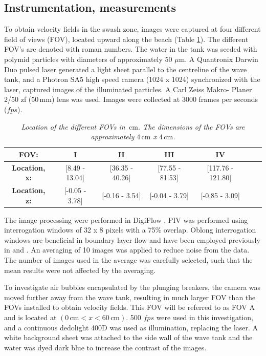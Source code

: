\documentclass[review, authoryear]{elsarticle}
\newcommand{\cm}{\,\mbox{cm}}
\newcommand{\mm}{\,\mbox{mm}}
\begin{document}
\subsection{Instrumentation, measurements}
\label{ins_measure}
To obtain velocity fields in the swash zone, images were captured at four different field of views (FOV), located upward along the beach (Table \ref{tab:loc}). The different FOV's are denoted with roman numbers. The water in the tank was seeded with polymid particles with diameters of approximately $50$ $\mu$m. A Quantronix Darwin Duo pulsed laser generated a light sheet parallel to the centreline of the wave tank, and a Photron SA5 high speed camera (1024 x 1024) synchronized with the laser, captured images of the illuminated particles. A Carl Zeiss Makro- Planer 2/50 zf ($50\mm$) lens was used. Images were collected at 3000 frames per seconds ($fps$).
 \begin{table}[]
 \centering
\caption{\textit{Location of the different FOVs  in $\cm$. The dimensions of the FOVs are approximately $4\cm$ x $4\cm$.}}
\begin{tabular}{|c|c|c|c|c|c|c|}
\hline
\textbf{FOV:}      & I                   & II                 & III     & IV \\ \hline
\textbf{Location, x:}& {[}8.49 - 13.04{]} & {[}36.35 - 40.26{]} & {[}77.55 - 81.53{]} & {[}117.76 - 121.80{]} 
 \\ \hline
\textbf{Location, z:}&  {[}-0.05 - 3.78{]} & {[}-0.16 - 3.54{]} & {[}-0.04 - 3.79{]} & {[}-0.85 - 3.09{]} 
\\ \hline
\end{tabular}
\label{tab:loc}
\end{table}
The image processing were performed in DigiFlow \citep{digiflow}. PIV was performed using interrogation windows of 32 x 8 pixels with a 75\% overlap. Oblong interrogation windows are beneficial in boundary layer flow and have been employed previously in \cite{liu2007boundary} and \cite{pedersen2013runup}. An averaging of 10 images was applied to reduce noise from the data. The number of images used in the average was carefully selected, such that the mean results were not affected by the averaging. 

To investigate air bubbles encapsulated by the plunging breakers, the camera was moved further away from the wave tank, resulting in much larger FOV than the FOVs installed to obtain velocity fields. This FOV will be referred to as FOV A and is located at $(0\cm< x <60\cm)$.  500 $fps$ were used in this investigation, and a continuous dedolight 400D was used as illumination, replacing the laser. A white background sheet was attached to the side wall of the wave tank and the water was dyed dark blue to increase the contrast of the images.
\end{document}
